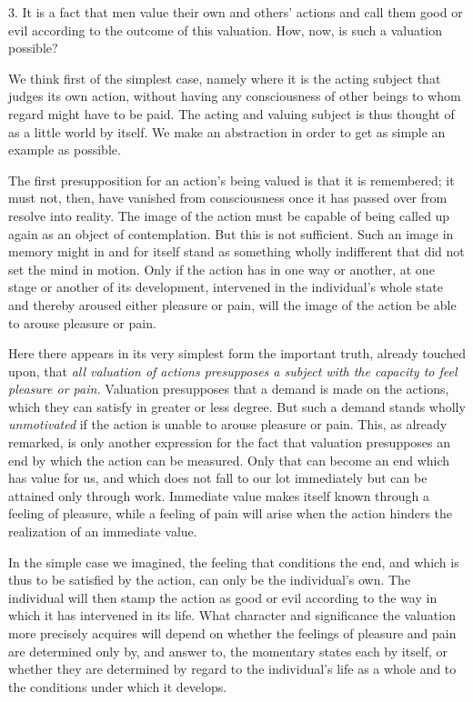 \documentclass[12pt,a4paper,openany]{book}
\newcommand{\opage}[1]{\marginnote{\footnotesize\textit{[#1]}}}
\begin{document}
3. It is a fact that men value their own and others' actions and call them good or evil according
to the outcome of this valuation. How, now, is such a valuation possible?

We think first of the simplest case, namely where it is the acting subject that judges its own
action, without having any consciousness of other beings to whom regard might have to be paid. The
acting and valuing subject is thus thought of as a little world by itself. We make an abstraction
in order to get as simple an example as possible.

The first presupposition for an action's being valued is that it is remembered; it must not,
then, have vanished from consciousness once it has passed over from resolve into reality. The
image of the action must be capable of being called up again as an object of contemplation. But
this is not sufficient. Such an image in memory might in and for itself stand as something wholly
indifferent that did not set the mind in motion. Only if the action has in one way or another, at
one stage or another of its development, intervened in the individual's whole state and thereby
aroused either pleasure or pain, will the image of the action be able to arouse pleasure or pain.

\opage{29}Here there appears in its very simplest form the important truth, already touched upon, that
\textit{all valuation of actions presupposes a subject with the capacity to feel pleasure or pain.}
Valuation presupposes that a demand is made on the actions, which they can satisfy in greater or
less degree. But such a demand stands wholly \textit{unmotivated} if the action is unable to arouse
pleasure or pain. This, as already remarked, is only another expression for the fact that valuation
presupposes an end by which the action can be measured. Only that can become an end which has value
for us, and which does not fall to our lot immediately but can be attained only through work.
Immediate value makes itself known through a feeling of pleasure, while a feeling of pain will
arise when the action hinders the realization of an immediate value.

In the simple case we imagined, the feeling that conditions the end, and which is thus to be
satisfied by the action, can only be the individual's own. The individual will then stamp the
action as good or evil according to the way in which it has intervened in its life. What character
and significance the valuation more precisely acquires will depend on whether the feelings of
pleasure and pain are determined only by, and answer to, the momentary states each by itself, or
whether they are determined by regard to the individual's life as a whole and to the conditions
under which it develops.
\end{document}
